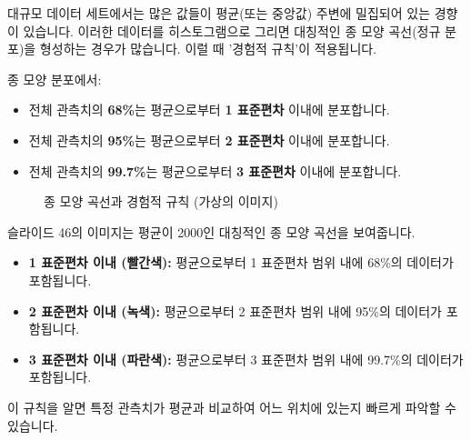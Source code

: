 \documentclass[11pt,a4paper]{book}
\theoremstyle{definition}
\begin{document}
대규모 데이터 세트에서는 많은 값들이 평균(또는 중앙값) 주변에 밀집되어 있는 경향이 있습니다. 이러한 데이터를 히스토그램으로 그리면 대칭적인 종 모양 곡선(정규 분포)을 형성하는 경우가 많습니다. 이럴 때 '경험적 규칙'이 적용됩니다.

\begin{infobox}[title=경험적 규칙의 내용]
종 모양 분포에서:
\begin{itemize}
    \item 전체 관측치의 \textbf{68\%}는 평균으로부터 \textbf{1 표준편차} 이내에 분포합니다.
    \item 전체 관측치의 \textbf{95\%}는 평균으로부터 \textbf{2 표준편차} 이내에 분포합니다.
    \item 전체 관측치의 \textbf{99.7\%}는 평균으로부터 \textbf{3 표준편차} 이내에 분포합니다.
\end{itemize}
\end{infobox}

\begin{figure}[h!]
    \centering
    \caption{종 모양 곡선과 경험적 규칙 (가상의 이미지)}
    \label{fig:empirical_rule}
\end{figure}
\begin{infobox}[title=가상의 이미지 설명: 종 모양 곡선과 경험적 규칙]
슬라이드 46의 이미지는 평균이 2000인 대칭적인 종 모양 곡선을 보여줍니다.
\begin{itemize}
    \item \textbf{1 표준편차 이내 (빨간색):} 평균으로부터 1 표준편차 범위 내에 68\%의 데이터가 포함됩니다.
    \item \textbf{2 표준편차 이내 (녹색):} 평균으로부터 2 표준편차 범위 내에 95\%의 데이터가 포함됩니다.
    \item \textbf{3 표준편차 이내 (파란색):} 평균으로부터 3 표준편차 범위 내에 99.7\%의 데이터가 포함됩니다.
\end{itemize}
이 규칙을 알면 특정 관측치가 평균과 비교하여 어느 위치에 있는지 빠르게 파악할 수 있습니다.
\end{infobox}
\end{document}
